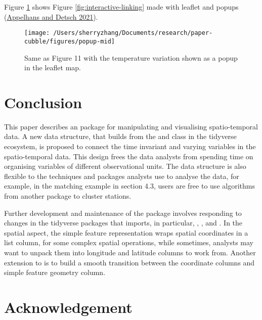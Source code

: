\documentclass{article}
\begin{document}
Figure \ref{fig:interactive-popup} shows Figure \ref{fig:interactive-linking} made with leaflet and popups (\protect\hyperlink{ref-leafpop}{Appelhans and Detsch 2021}).

\begin{figure}

{\centering \texttt{[image: /Users/sherryzhang/Documents/research/paper-cubble/figures/popup-mid]} 

}

\caption{Same as Figure 11 with the temperature variation shown as a popup in the leaflet map.}\label{fig:interactive-popup}
\end{figure}

\hypertarget{conclude}{%
\section{Conclusion}\label{conclude}}

This paper describes an  package  for manipulating and visualising spatio-temporal data. A new data structure,  that builds from the  and  class in the tidyverse ecosystem, is proposed to connect the time invariant and varying variables in the spatio-temporal data. This design frees the data analysts from spending time on organising variables of different observational units. The data structure is also flexible to the techniques and packages analysts use to analyse the data, for example, in the matching example in section 4.3, users are free to use algorithms from another package to cluster stations.

Further development and maintenance of the package involves responding to changes in the tidyverse packages that  imports, in particular, , , and . In the spatial aspect, the simple feature representation wraps spatial coordinates in a list column, for some complex spatial operations, while sometimes, analysts may want to unpack them into longitude and latitude columns to work from. Another extension to  is to build a smooth transition between the coordinate columns and simple feature geometry column.

\newpage

\hypertarget{acknowledgement}{%
\section{Acknowledgement}\label{acknowledgement}}
\end{document}
